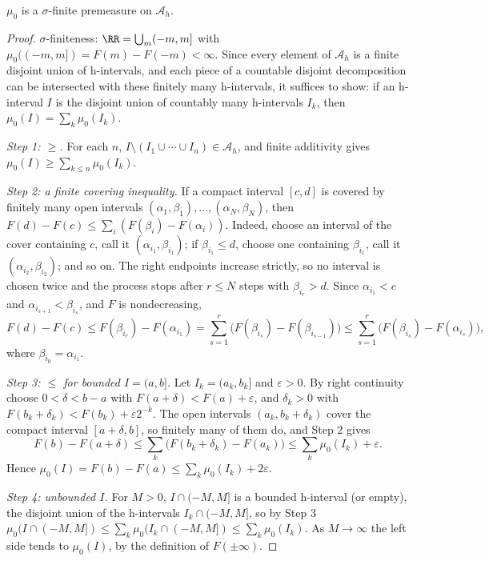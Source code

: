 \begin{lemma}\label{measure-theory:lemma-stieltjes-premeasure}
$\mu_0$ is a $\sigma$-finite premeasure on $\mathcal{A}_h$.
\end{lemma}

\begin{proof}
$\sigma$-finiteness: $\RR = \bigcup_m(-m, m]$ with $\mu_0((-m, m]) = F(m) - F(-m) < \infty$. Since every element of $\mathcal{A}_h$ is a finite disjoint union of h-intervals, and each piece of a
countable disjoint decomposition can be intersected with these finitely many h-intervals, it suffices to show: if an h-interval $I$ is the disjoint union of countably many h-intervals $I_k$, then
$\mu_0(I) = \sum_k\mu_0(I_k)$.

\emph{Step 1: $\geq$.} For each $n$, $I \setminus (I_1 \cup \cdots \cup I_n) \in \mathcal{A}_h$, and finite additivity gives $\mu_0(I) \geq \sum_{k \leq n}\mu_0(I_k)$.

\emph{Step 2: a finite covering inequality.} If a compact interval $[c, d]$ is covered by finitely many open intervals $(\alpha_1, \beta_1), \ldots, (\alpha_N, \beta_N)$, then
$F(d) - F(c) \leq \sum_i(F(\beta_i) - F(\alpha_i))$. Indeed, choose an interval of the cover containing $c$, call it $(\alpha_{i_1}, \beta_{i_1})$; if $\beta_{i_1} \leq d$, choose one containing
$\beta_{i_1}$, call it $(\alpha_{i_2}, \beta_{i_2})$; and so on. The right endpoints increase strictly, so no interval is chosen twice and the process stops after $r \leq N$ steps with $\beta_{i_r} > d$.
Since $\alpha_{i_1} < c$ and $\alpha_{i_{s+1}} < \beta_{i_s}$, and $F$ is nondecreasing,
\[
F(d) - F(c) \leq F(\beta_{i_r}) - F(\alpha_{i_1}) = \sum_{s=1}^r\bigl(F(\beta_{i_s}) - F(\beta_{i_{s-1}})\bigr) \leq \sum_{s=1}^r\bigl(F(\beta_{i_s}) - F(\alpha_{i_s})\bigr),
\]
where $\beta_{i_0} = \alpha_{i_1}$.

\emph{Step 3: $\leq$ for bounded $I = (a, b]$.} Let $I_k = (a_k, b_k]$ and $\varepsilon > 0$. By right continuity choose $0 < \delta < b - a$ with $F(a + \delta) < F(a) + \varepsilon$, and $\delta_k > 0$ with
$F(b_k + \delta_k) < F(b_k) + \varepsilon2^{-k}$. The open intervals $(a_k, b_k + \delta_k)$ cover the compact interval $[a + \delta, b]$, so finitely many of them do, and Step 2 gives
\[
F(b) - F(a + \delta) \leq \sum_k\bigl(F(b_k + \delta_k) - F(a_k)\bigr) \leq \sum_k\mu_0(I_k) + \varepsilon .
\]
Hence $\mu_0(I) = F(b) - F(a) \leq \sum_k\mu_0(I_k) + 2\varepsilon$.

\emph{Step 4: unbounded $I$.} For $M > 0$, $I \cap (-M, M]$ is a bounded h-interval (or empty), the disjoint union of the h-intervals $I_k \cap (-M, M]$, so by Step 3
$\mu_0(I \cap (-M, M]) \leq \sum_k\mu_0(I_k \cap (-M, M]) \leq \sum_k\mu_0(I_k)$. As $M \to \infty$ the left side tends to $\mu_0(I)$, by the definition of $F(\pm\infty)$.
\end{proof}

